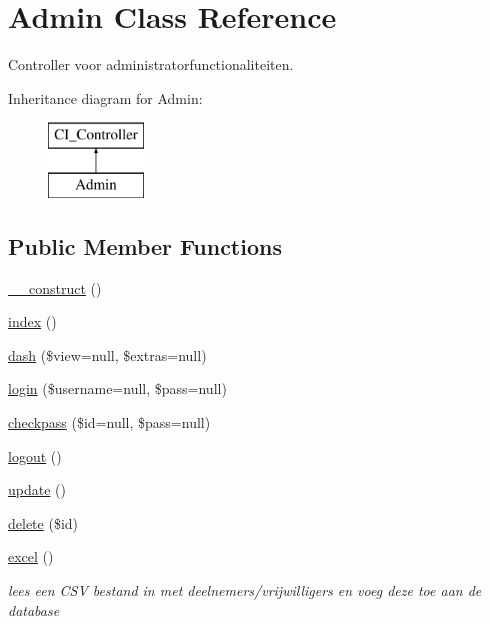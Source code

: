 \hypertarget{class_admin}{}\section{Admin Class Reference}
\label{class_admin}


Controller voor administratorfunctionaliteiten.  


Inheritance diagram for Admin\+:\begin{figure}[H]
\begin{center}
\leavevmode
\includegraphics[height=2.000000cm]{class_admin}
\end{center}
\end{figure}
\subsection*{Public Member Functions}
\begin{DoxyCompactItemize}
\item 
\mbox{\hyperlink{class_admin_a095c5d389db211932136b53f25f39685}{\+\_\+\+\_\+construct}} ()
\item 
\mbox{\hyperlink{class_admin_a149eb92716c1084a935e04a8d95f7347}{index}} ()
\item 
\mbox{\hyperlink{class_admin_a35f5125b52883ea70807c42282f60b54}{dash}} (\$view=null, \$extras=null)
\item 
\mbox{\hyperlink{class_admin_a3ea73f2d243749d401f168a6dc356528}{login}} (\$username=null, \$pass=null)
\item 
\mbox{\hyperlink{class_admin_a2df41f5feb0a50e8b308f7a7b6b25dfb}{checkpass}} (\$id=null, \$pass=null)
\item 
\mbox{\hyperlink{class_admin_a082405d89acd6835c3a7c7a08a7adbab}{logout}} ()
\item 
\mbox{\hyperlink{class_admin_a842e4774e3b3601a005b995c02f7e883}{update}} ()
\item 
\mbox{\hyperlink{class_admin_a2f8258add505482d7f00ea26493a5723}{delete}} (\$id)
\item 
\mbox{\hyperlink{class_admin_ab619c12069c76b755a2ceae543d527fe}{excel}} ()
\begin{DoxyCompactList}\small\item\em lees een C\+SV bestand in met deelnemers/vrijwilligers en voeg deze toe aan de database \end{DoxyCompactList}\end{DoxyCompactItemize}


